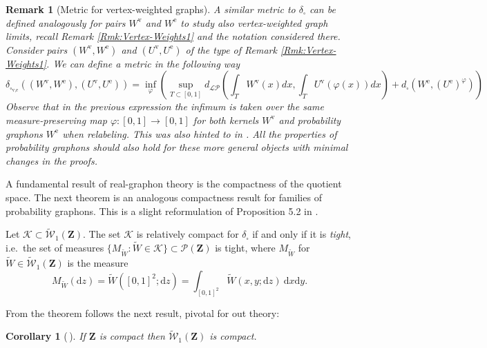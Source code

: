 \documentclass[12pt,twoside,a4paper]{article}
\newtheorem{corollary}{Corollary}[theorem]
\newtheorem{remark}[theorem]{Remark}
\newcommand{\cK}{{\mathcal K}}  %
\newcommand{\Space}{\mathbf{Z}}
\newcommand{\UGraphon}{\widetilde{\mathcal{W}}_1}
\newcommand{\drv}{\mathrm{d}}
\begin{document}
\begin{remark}[Metric for vertex-weighted graphs]
\label{rmk:VertexWeights2}
A similar metric to $\delta_{\square}$ can be defined analogously for pairs $W^{\text{v}}$ and $W^{\text{e}}$ to study also vertex-weighted graph limits, recall Remark \ref{Rmk:Vertex-Weights1} and the notation considered there. Consider pairs $(W^{\text{v}},W^{\text{e}})$ and $(U^{\text{v}},U^{\text{e}})$ of the type of Remark \ref{Rmk:Vertex-Weights1}. We can define a metric in the following way \[
\delta_{\square_{\text{v},\text{e}}}\left((W^{\text{v}},W^{\text{e}}),(U^{\text{v}},U^{\text{e}})\right)=\inf_{\varphi}\left(\sup_{T\subset [0,1]}d_{\mathcal{LP}}\left(\int_T W^{\text{v}}(x)dx,\int_T U^{\text{v}}(\varphi(x))dx\right)+d_{\square}(W^{\text{e}},(U^{\text{e}})^{\varphi})\right)
\]
Observe that in the previous expression the infimum is taken over the same measure-preserving map $\varphi : [0,1]\to[0,1]$ for both kernels $W^{\text{v}}$ and probability graphons $W^{\text{e}}$ when relabeling. This was also hinted to in \cite[Remark 1.7]{abraham2023probabilitygraphons}. All the properties of probability graphons should also hold for these more general objects with minimal changes in the proofs.
\end{remark}


A fundamental result of real-graphon theory is the compactness of the quotient space. The next theorem is an analogous compactness result for families of probability graphons. This is a slight reformulation of Proposition 5.2 in \cite{abraham2023probabilitygraphons}.

\begin{theorem}\label{ThmRelCompact}
Let $\cK\subset \UGraphon(\Space).$ The set $\cK$ is relatively compact for $\delta_{\square}$ if and only if it is \emph{tight}, i.e.\ the set of measures $\{ M_{\widetilde W} : \widetilde W\in\mathcal{K} \} \subset \mathcal{P}(\Space)$ is tight, where $M_{\widetilde W}$ for $\widetilde W\in \UGraphon(\Space)$ is the measure
\begin{equation}
  \label{eq:def-MW}
M_{\widetilde W}(\drv z) 
=  \widetilde W  ([0,1]^2; \drv z)
= \int_{[0,1]^2} \widetilde W (x,y;\drv z) \ \drv x \drv y.
\end{equation}
\end{theorem}
From the theorem follows the next result, pivotal for out theory:

\begin{corollary}[{\cite[Theorem 5.1]{abraham2023probabilitygraphons}}\,]\label{cor:compact}
If $\Space$ is compact then $\UGraphon(\Space)$ is compact. 
\end{corollary}
\end{document}
